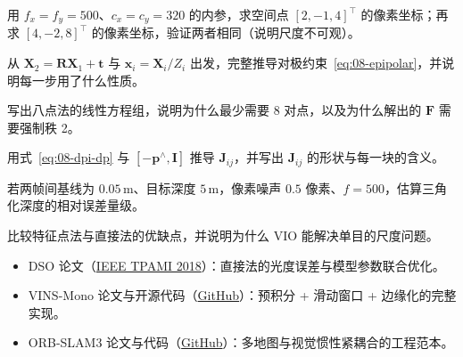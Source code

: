 \begin{problemset}

  \item 用 $f_x=f_y=500$、$c_x=c_y=320$ 的内参，求空间点 $[2,-1,4]^{\top}$ 的像素坐标；再求 $[4,-2,8]^{\top}$ 的像素坐标，验证两者相同（说明尺度不可观）。
  \item 从 $\bm{X}_2=\bm{R}\bm{X}_1+\bm{t}$ 与 $\bm{x}_i=\bm{X}_i/Z_i$ 出发，完整推导对极约束~\eqref{eq:08-epipolar}，并说明每一步用了什么性质。
  \item 写出八点法的线性方程组，说明为什么最少需要 8 对点，以及为什么解出的 $\bm{F}$ 需要强制秩 2。
  \item 用式~\eqref{eq:08-dpi-dp} 与 $[-\bm{p}^{\wedge},\bm{I}]$ 推导 $\bm{J}_{ij}$，并写出 $\bm{J}_{ij}$ 的形状与每一块的含义。
  \item 若两帧间基线为 $0.05\,\mathrm{m}$、目标深度 $5\,\mathrm{m}$，像素噪声 $0.5$ 像素、$f=500$，估算三角化深度的相对误差量级。
  \item 比较特征点法与直接法的优缺点，并说明为什么 VIO 能解决单目的尺度问题。
\end{problemset}

\begin{reading}

\begin{itemize}
  \item DSO 论文（\href{https://ieeexplore.ieee.org/document/8220081}{IEEE TPAMI 2018}）：直接法的光度误差与模型参数联合优化。
  \item VINS-Mono 论文与开源代码（\href{https://github.com/HKUST-Aerial-Robotics/VINS-Mono}{GitHub}）：预积分 + 滑动窗口 + 边缘化的完整实现。
  \item ORB-SLAM3 论文与代码（\href{https://github.com/UZ-SLAMLab/ORB_SLAM3}{GitHub}）：多地图与视觉惯性紧耦合的工程范本。
\end{itemize}


\end{reading}
